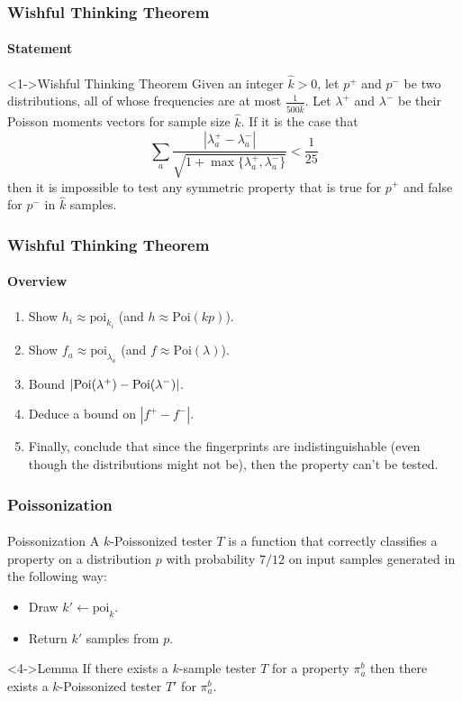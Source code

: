 \documentclass{beamer}
\begin{document}
\begin{frame}
  \frametitle{Wishful Thinking Theorem} \framesubtitle{Statement}

  \begin{block}<1->{Wishful Thinking Theorem}
    Given an integer $\hat{k}>0$, let $p^+$ and $p^-$ be two distributions,
    all of whose frequencies are at most $\frac{1}{500\hat{k}}$. Let
    $\lambda^+$ and $\lambda^-$ be their Poisson moments vectors for sample
    size $\hat{k}$. If it is the case that
    \begin{equation*}
      \sum_a\frac{|\lambda^+_a-\lambda^-_a|}{\sqrt{1+\max\{\lambda^+_a,\lambda^-_a\}}}<\frac{1}{25}
    \end{equation*}
    then it is impossible to test any symmetric property that is true
    for $p^+$ and false for $p^-$ in $\hat{k}$ samples.
  \end{block}
\end{frame}

\begin{frame}
  \frametitle{Wishful Thinking Theorem} \framesubtitle{Overview}

  \begin{enumerate}
  \item<1-> Show $h_i\approx \mbox{poi}_{k_i}$ (and $h \approx \mbox{Poi}(kp)$).
  \item<2-> Show $f_a \approx \mbox{poi}_{\lambda_a}$ (and $f \approx
    \mbox{Poi}(\lambda)$).
  \item<3-> Bound $|\mbox{Poi}(\lambda^+)-\mbox{Poi}(\lambda^-)|$.
  \item<4-> Deduce a bound on $|f^+-f^-|$.
  \item<5-> Finally, conclude that since the fingerprints are
    indistinguishable (even though the distributions might not be),
    then the property can't be tested.
  \end{enumerate}

\end{frame}

\begin{frame}
  \frametitle{Poissonization} \framesubtitle{}

  \begin{block}{Poissonization}
    A $k$-Poissonized tester $T$ is a function that correctly
    classifies a property on a distribution $p$ with probability
    $7/12$ on input samples generated in the following way:
    \begin{itemize}
    \item<2-> Draw $k'\leftarrow \mbox{poi}_k$.
    \item<3-> Return $k'$ samples from $p$.
    \end{itemize}
  \end{block}

  \begin{block}<4->{Lemma}
    If there exists a $k$-sample tester $T$ for a property $\pi_a^b$
    then there exists a $k$-Poissonized tester $T'$ for $\pi_a^b$.
  \end{block}
  
\end{frame}
\end{document}
